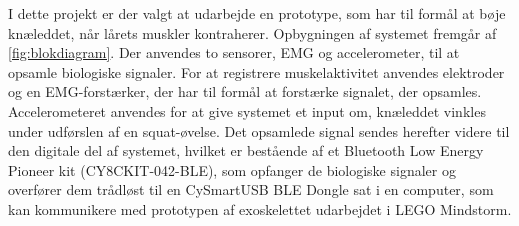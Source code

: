 I dette projekt er der valgt at udarbejde en prototype, som har til formål at bøje knæleddet, når lårets muskler kontraherer. Opbygningen af systemet fremgår af \autoref{fig:blokdiagram}. Der anvendes to sensorer, EMG og accelerometer, til at opsamle biologiske signaler. For at registrere muskelaktivitet anvendes elektroder og en EMG-forstærker, der har til formål at forstærke signalet, der opsamles. Accelerometeret anvendes for at give systemet et input om, knæleddet vinkles  under udførslen af en squat-øvelse. Det opsamlede signal sendes herefter videre til den digitale del af systemet, hvilket er bestående af et Bluetooth Low Energy Pioneer kit (CY8CKIT-042-BLE), som opfanger de biologiske signaler og overfører dem trådløst til en CySmartUSB BLE Dongle sat i en computer, som kan kommunikere med prototypen af exoskelettet udarbejdet i LEGO Mindstorm. 


